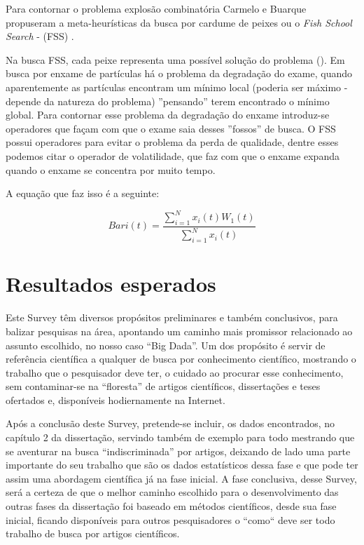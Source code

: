 \documentclass[conference,compsoc]{IEEEtran}
\begin{document}
Para contornar o problema explosão combinatória Carmelo e Buarque propuseram a meta-heurísticas da busca por cardume de peixes
ou o \textit{Fish School Search} - (FSS) \cite{Filho2008}.

Na busca FSS, cada peixe representa uma possível solução do problema (\cite{Filho2008}).
Em busca por enxame de partículas há o problema da degradação do exame, quando aparentemente as partículas encontram
um mínimo local (poderia ser máximo - depende da natureza do problema) ''pensando'' terem encontrado o mínimo global.
Para contornar esse problema da degradação do enxame introduz-se operadores que façam com que o exame saia desses ''fossos''
de busca.
O FSS possui operadores para evitar o problema da perda de qualidade, dentre esses podemos citar o operador de volatilidade, 
que faz com que o enxame expanda quando o enxame se concentra por muito tempo.

A equação que faz isso é a seguinte:

\begin{equation}
Bari(t) = \frac{\sum_{i=1}^{N}x_i(t)W_1(t)}{\sum_{i=1}^{N}x_i(t)}
\end{equation}




\section{Resultados esperados}

Este Survey têm diversos propósitos preliminares e também conclusivos, para balizar pesquisas na área, apontando um caminho mais promissor relacionado ao assunto escolhido, no nosso caso “Big Dada”. Um dos propósito é servir de referência científica
a qualquer de busca por conhecimento científico, mostrando o trabalho que o pesquisador deve ter, o cuidado ao procurar 
esse conhecimento, sem contaminar-se na ``floresta'' de artigos científicos, dissertações e teses ofertados e, disponíveis
hodiernamente na Internet. 

Após a conclusão deste Survey, pretende-se incluir, os dados encontrados, no capítulo 2 da dissertação, servindo também 
de exemplo para todo mestrando que se aventurar na busca “indiscriminada” por artigos, deixando de lado uma parte 
importante do seu trabalho que são os dados estatísticos dessa fase e que pode ter assim uma abordagem científica já na 
fase inicial.
A fase conclusiva, desse Survey, será a certeza de que o melhor caminho escolhido para o desenvolvimento das outras
fases da dissertação foi baseado em métodos científicos, desde sua fase inicial, ficando disponíveis para outros pesquisadores 
o ``como`` deve ser todo trabalho de busca por artigos científicos.
\end{document}
